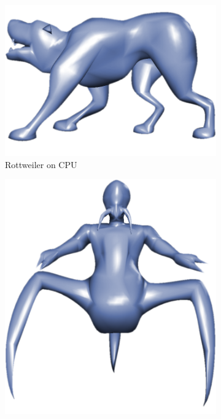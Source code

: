\begin{figure}
	\centering
	\begin{subfigure}[b]{0.2\textwidth}
		\centering
		\includegraphics[width=\textwidth]{content/img/results/cpugpu/dogCPU.png}
		\caption{Rottweiler on CPU}
		\label{fig:results:cpugpu:cpuDog}
	\end{subfigure}
	\hspace{0.1\textwidth}
	\begin{subfigure}[b]{0.2\textwidth}
		\centering
		\includegraphics[width=\textwidth]{content/img/results/cpugpu/voreCPU.png}

\end{subfigure}
\end{figure}
